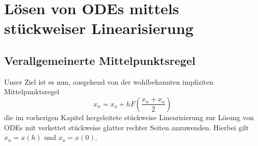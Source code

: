 \chapter{Lösen von ODEs mittels stückweiser Linearisierung}

\section{Verallgemeinerte Mittelpunktsregel}

Unser Ziel ist es nun, ausgehend von der wohlbekannten impliziten Mittelpunktsregel
\[
 x_n  = x_a + hF\left( \frac{x_n + x_a}{2}\right)
\]
die im vorherigen Kapitel hergeleitete stückweise Linearisierung zur Lösung von ODEs mit verkettet stückweise glatter rechter Seiten anzuwenden.
Hierbei gilt $x_n = x(h)$ und $x_a = x(0)$.

